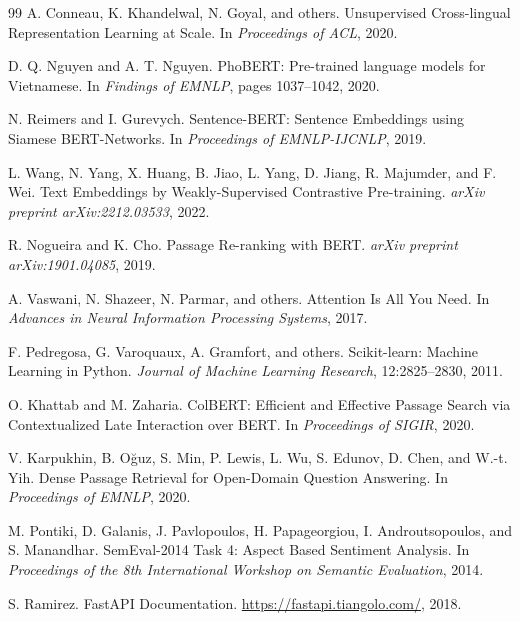 \begin{thebibliography}{99}
A. Conneau, K. Khandelwal, N. Goyal, and others.
Unsupervised Cross-lingual Representation Learning at Scale.
In \textit{Proceedings of ACL}, 2020.

D. Q. Nguyen and A. T. Nguyen.
PhoBERT: Pre-trained language models for Vietnamese.
In \textit{Findings of EMNLP}, pages 1037--1042, 2020.

N. Reimers and I. Gurevych.
Sentence-BERT: Sentence Embeddings using Siamese BERT-Networks.
In \textit{Proceedings of EMNLP-IJCNLP}, 2019.

L. Wang, N. Yang, X. Huang, B. Jiao, L. Yang, D. Jiang, R. Majumder, and F. Wei.
Text Embeddings by Weakly-Supervised Contrastive Pre-training.
\textit{arXiv preprint arXiv:2212.03533}, 2022.

R. Nogueira and K. Cho.
Passage Re-ranking with BERT.
\textit{arXiv preprint arXiv:1901.04085}, 2019.

A. Vaswani, N. Shazeer, N. Parmar, and others.
Attention Is All You Need.
In \textit{Advances in Neural Information Processing Systems}, 2017.

F. Pedregosa, G. Varoquaux, A. Gramfort, and others.
Scikit-learn: Machine Learning in Python.
\textit{Journal of Machine Learning Research}, 12:2825--2830, 2011.

O. Khattab and M. Zaharia.
ColBERT: Efficient and Effective Passage Search via Contextualized Late Interaction over BERT.
In \textit{Proceedings of SIGIR}, 2020.

V. Karpukhin, B. Oğuz, S. Min, P. Lewis, L. Wu, S. Edunov, D. Chen, and W.-t. Yih.
Dense Passage Retrieval for Open-Domain Question Answering.
In \textit{Proceedings of EMNLP}, 2020.

M. Pontiki, D. Galanis, J. Pavlopoulos, H. Papageorgiou, I. Androutsopoulos, and S. Manandhar.
SemEval-2014 Task 4: Aspect Based Sentiment Analysis.
In \textit{Proceedings of the 8th International Workshop on Semantic Evaluation}, 2014.

S. Ramirez.
FastAPI Documentation.
\url{https://fastapi.tiangolo.com/}, 2018.

\end{thebibliography}

